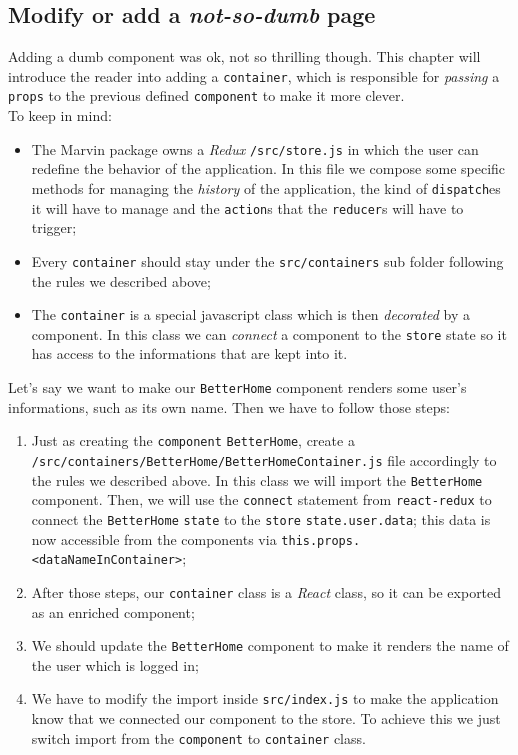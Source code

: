 \subsection{Modify or add a \emph{not-so-dumb} page}
Adding a dumb component was ok, not so thrilling though. This chapter will introduce the reader into adding a \verb|container|, which is responsible for \emph{passing} a \verb|props| to the previous defined \verb|component| to make it more clever.
\\To keep in mind:
\begin{itemize}
	\item The Marvin package owns a \emph{Redux} \verb|/src/store.js| in which the user can redefine the behavior of the application. In this file we compose some specific methods for managing the \emph{history} of the application, the kind of \verb|dispatch|es it will have to manage and the \verb|action|s that the \verb|reducer|s will have to trigger;
	\item Every \verb|container| should stay under the \verb|src/containers| sub folder following the rules we described above;
	\item The \verb|container| is a special javascript class which is then \emph{decorated} by a component. In this class we can \emph{connect} a component to the \verb|store| state so it has access to the informations that are kept into it.
\end{itemize} 
Let's say we want to make our \verb|BetterHome| component renders some user's informations, such as its own name. Then we have to follow those steps:
\begin{enumerate}
	\item Just as creating the \verb|component| \verb|BetterHome|, create a \verb|/src/containers/BetterHome/BetterHomeContainer.js| file accordingly to the rules we described above. In this class we will import the \verb|BetterHome| component. Then, we will use the \verb|connect| statement from \verb|react-redux| to connect the \verb|BetterHome| \verb|state| to the \verb|store| \verb|state.user.data|; this data is now accessible from the components via \verb|this.props.<dataNameInContainer>|;
	\item After those steps, our \verb|container| class is a \emph{React} class, so it can be exported as an enriched component;
	\item We should update the \verb|BetterHome| component to make it renders the name of the user which is logged in;
	\item We have to modify the import inside \verb|src/index.js| to make the application know that we connected our component to the store. To achieve this we just switch import from the \verb|component| to \verb|container| class.
\end{enumerate}
